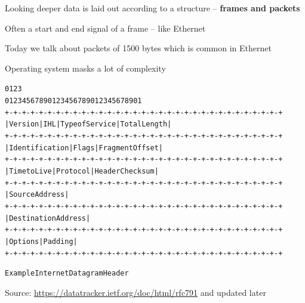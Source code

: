 \documentclass[Screen16to9,17pt]{foils}
\begin{document}
\begin{list1}
\item Looking deeper data is laid out according to a structure -- \textbf{frames and packets}
\item Often a start and end signal of a frame -- like Ethernet
\item Today we talk about packets of 1500 bytes which is common in Ethernet
\item Operating system masks a lot of complexity
\end{list1}





\begin{alltt}\footnotesize
    0                   1                   2                   3
    0 1 2 3 4 5 6 7 8 9 0 1 2 3 4 5 6 7 8 9 0 1 2 3 4 5 6 7 8 9 0 1
   +-+-+-+-+-+-+-+-+-+-+-+-+-+-+-+-+-+-+-+-+-+-+-+-+-+-+-+-+-+-+-+-+
   |Version|  IHL  |Type of Service|          Total Length         |
   +-+-+-+-+-+-+-+-+-+-+-+-+-+-+-+-+-+-+-+-+-+-+-+-+-+-+-+-+-+-+-+-+
   |         Identification        |Flags|      Fragment Offset    |
   +-+-+-+-+-+-+-+-+-+-+-+-+-+-+-+-+-+-+-+-+-+-+-+-+-+-+-+-+-+-+-+-+
   |  Time to Live |    Protocol   |         Header Checksum       |
   +-+-+-+-+-+-+-+-+-+-+-+-+-+-+-+-+-+-+-+-+-+-+-+-+-+-+-+-+-+-+-+-+
   |                       Source Address                          |
   +-+-+-+-+-+-+-+-+-+-+-+-+-+-+-+-+-+-+-+-+-+-+-+-+-+-+-+-+-+-+-+-+
   |                    Destination Address                        |
   +-+-+-+-+-+-+-+-+-+-+-+-+-+-+-+-+-+-+-+-+-+-+-+-+-+-+-+-+-+-+-+-+
   |                    Options                    |    Padding    |
   +-+-+-+-+-+-+-+-+-+-+-+-+-+-+-+-+-+-+-+-+-+-+-+-+-+-+-+-+-+-+-+-+

                    Example Internet Datagram Header
\end{alltt}
Source: \url{https://datatracker.ietf.org/doc/html/rfc791} and updated later
\end{document}
